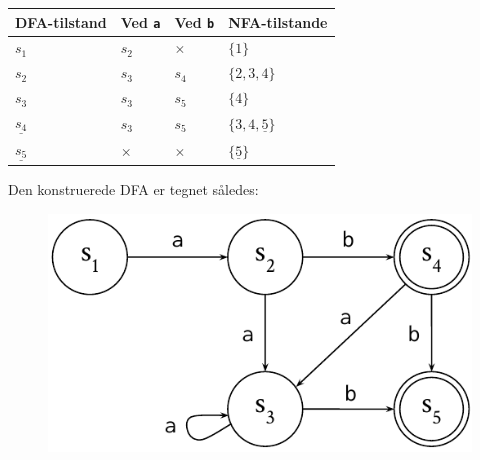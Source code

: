 \begin{table}[H]
    \centering
    \begin{tabular}{llll}
        \toprule
         DFA-tilstand & Ved \texttt{a} & Ved \texttt{b} & NFA-tilstande \\
         \midrule
         $s_1$ & $s_2$ & $\times$ & $\{ 1 \}$ \\
         $s_2$ & $s_3$ & $s_4$ & $\{ 2, 3, 4 \}$ \\
         $s_3$ & $s_3$ & $s_5$ & $\{ 4 \}$ \\
         $\underline{s_4}$ & $s_3$ & $s_5$ & $\{ 3, 4, \underline{5} \}$ \\
         $\underline{s_5}$ & $\times$ & $\times$ & $\{ \underline{5} \}$ \\
         \bottomrule
    \end{tabular}
\end{table}

Den konstruerede DFA er tegnet således:

\begin{figure}[H]
    \centering
    \includegraphics[scale=0.8]{2019-dec/figs/dfa.pdf}
\end{figure}
